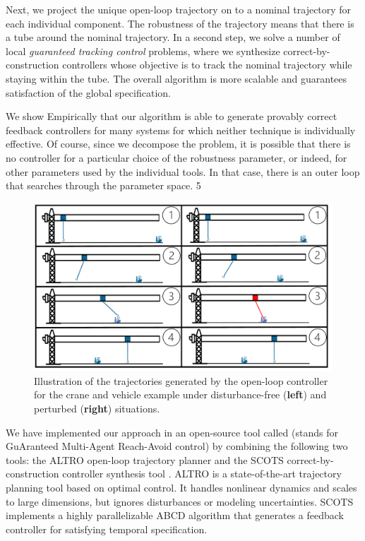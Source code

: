 Next, we project the unique open-loop trajectory on to a nominal trajectory for each individual component.
The robustness of the trajectory means that there is a tube around the nominal trajectory.
In a second step, we solve a number of local \emph{guaranteed tracking control} problems, where we synthesize correct-by-construction
controllers whose objective is to track the nominal trajectory while staying within the tube.
The overall algorithm is more scalable and guarantees satisfaction of the global specification.

We show Empirically that our algorithm is able to generate provably correct feedback controllers for many
systems for which neither technique is individually effective.
Of course, since we decompose the problem, it is possible that there is no controller for a particular choice of the
robustness parameter, or indeed, for other parameters used by the individual tools.
In that case, there is an outer loop that searches through the parameter space.
5
\begin{figure}[t]
	\centering
	\includegraphics[width=\columnwidth]{figures/updated_crane.pdf}
	\caption{Illustration of the trajectories generated by the open-loop controller for the crane and vehicle example under disturbance-free (\textbf{left}) and perturbed (\textbf{right}) situations.}
	\label{fig:cr_and_lft}
\end{figure}

We have implemented our approach in an open-source tool called \tool (stands for GuAranteed Multi-Agent Reach-Avoid control)
by combining the following two tools: the ALTRO open-loop trajectory planner \cite{howell2019altro} and the 
SCOTS correct-by-construction controller synthesis tool \cite{Rungger2016scots}. 
ALTRO is a state-of-the-art trajectory planning tool based on optimal control.
It handles nonlinear dynamics and scales to large dimensions, but ignores disturbances or modeling uncertainties.
SCOTS implements a highly parallelizable ABCD algorithm that generates a feedback controller for satisfying temporal specification.

